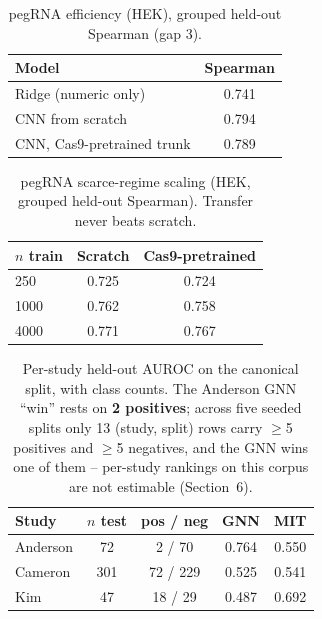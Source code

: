 \begin{table}[h]\centering\caption{pegRNA efficiency (HEK), grouped held-out Spearman (gap 3).}\label{tab:pegrna}\begin{tabular}{lc}\hline Model & Spearman \\\hline
Ridge (numeric only) & 0.741 \\
CNN from scratch & 0.794 \\
CNN, Cas9-pretrained trunk & 0.789 \\
\hline\end{tabular}\end{table}
\begin{table}[h]\centering\caption{pegRNA scarce-regime scaling (HEK, grouped held-out Spearman). Transfer never beats scratch.}\label{tab:scaling}\begin{tabular}{lcc}\hline $n$ train & Scratch & Cas9-pretrained \\\hline
250 & 0.725 & 0.724 \\
1000 & 0.762 & 0.758 \\
4000 & 0.771 & 0.767 \\
\hline\end{tabular}\end{table}
\begin{table}[h]\centering\caption{Per-study held-out AUROC on the canonical split, with class counts. The Anderson GNN ``win'' rests on \textbf{2 positives}; across five seeded splits only 13 (study, split) rows carry $\ge$5 positives and $\ge$5 negatives, and the GNN wins one of them -- per-study rankings on this corpus are not estimable (Section~6).}\label{tab:perstudy}\begin{tabular}{lcccc}\hline Study & $n$ test & pos / neg & GNN & MIT \\\hline
Anderson & 72 & 2 / 70 & 0.764 & 0.550 \\
Cameron & 301 & 72 / 229 & 0.525 & 0.541 \\
Kim & 47 & 18 / 29 & 0.487 & 0.692 \\
\hline\end{tabular}\end{table}
